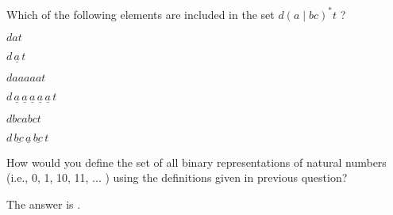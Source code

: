 \documentclass{ximera}
\begin{document}
Which of the following elements are included in the set $d (a \mid bc)^*t  $ ?

\begin{question}
$dat$
\begin{solution}
\begin{multipleChoice}
\end{multipleChoice}
\end{solution}
$d \, \underline{a} \, t$
\end{question}

\begin{question}
$daaaaat$
\begin{solution}
\begin{multipleChoice}
\end{multipleChoice}
\end{solution}
$d \, \underline{a} \, \underline{a} \, \underline{a} \, \underline{a} \, \underline{a} \, t$
\end{question}

\begin{question}
$dbcabct$
\begin{solution}
\begin{multipleChoice}
\end{multipleChoice}
\end{solution}
$d \, \underline{bc} \, \underline{a} \, \underline{bc} \, t$
\end{question}


\begin{question}
How would you define the set of all binary representations of natural numbers (i.e., 0, 1, 10, 11, ... ) using the definitions given in previous question?

\begin{solution}%
The answer is .
\end{solution}
\end{question}
\end{document}

